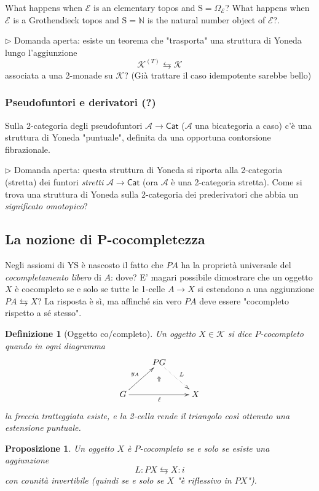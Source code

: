 \documentclass[11pt]{article}
\def\Cat{\mathsf{Cat}}
\theoremstyle{reference}
\newtheorem{definition}[theorem]{Definizione}
\newtheorem{proposition}[theorem]{Proposizione}
\begin{document}
What happens when \(\mathcal E\) is an elementary topos and
\(\mathrm{S}=\Omega_{\mathcal E}\)? What happens when
\(\mathcal E\) is a Grothendieck topos and \(\mathrm S =
\mathbb{N}\) is the natural number object of \(\mathcal E\)?.

\(\rhd\) Domanda aperta: esiste un teorema che "trasporta" una
struttura di Yoneda lungo l'aggiunzione $$ \mathcal K^{(T)}
\leftrightarrows \mathcal K $$ associata a una 2-monade su
\(\mathcal K\)? (Già trattare il caso idempotente sarebbe
bello)

\subsubsection{Pseudofuntori e derivatori (?)}
\label{sec:org4fe778d}

Sulla 2-categoria degli pseudofuntori \(\mathcal A \to \Cat\)
(\(\mathcal A\) una bicategoria a caso) c'è una struttura di
Yoneda "puntuale", definita da una opportuna contorsione
fibrazionale.

\(\rhd\) Domanda aperta: questa struttura di Yoneda si riporta
alla 2-categoria (stretta) dei funtori \emph{stretti} \(\mathcal A
\to \Cat\) (ora \(\mathcal A\) è una 2-categoria stretta). Come
si trova una struttura di Yoneda sulla 2-categoria dei
prederivatori che abbia un \emph{significato omotopico}?

\subsection{La nozione di P-cocompletezza}
\label{sec:orgd2b7749}

Negli assiomi di YS è nascosto il fatto che \(PA\) ha la
proprietà universale del \emph{cocompletamento libero} di \(A\):
dove? E' magari possibile dimostrare che un oggetto \(X\) è
cocompleto se e solo se tutte le 1-celle \(A\to X\) si
estendono a una aggiunzione \(PA \leftrightarrows X\)? La
risposta è sì, ma affinché sia vero \(PA\) deve essere
"cocompleto rispetto a sé stesso".

\begin{definition}[Oggetto co/completo]
Un oggetto $X\in \mathcal K$ si dice $P$\hyp{}\emph{cocompleto} quando in ogni diagramma
$$
\xymatrix{
& PG\ar@{.>}[dr]^L & \\
G\ar[rr]_\ell\ar[ur]^{y_A} &\ar@{}[u]|\Uparrow & X
}
$$
la freccia tratteggiata esiste, e la 2-cella rende il triangolo così ottenuto una estensione puntuale.
\end{definition}
\begin{proposition}
Un oggetto $X$ è $P$\hyp{}cocompleto se e solo se esiste una aggiunzione
$$
L : PX \leftrightarrows X : i 
$$
con counità invertibile (quindi se e solo se $X$ "è riflessivo in $PX$").
\end{proposition}
\end{document}
